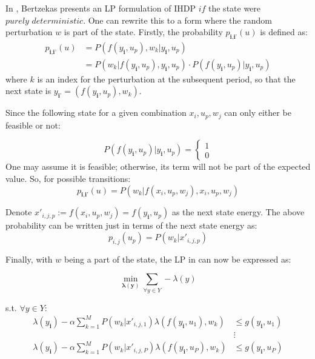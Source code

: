 \documentclass[conference]{IEEEtran}
\begin{document}
In \cite{bertsekas1995dynamic}, Bertzekas presents an LP formulation of IHDP $\textit{if}$ the state were $\textit{purely deterministic}$. One can rewrite this to a form where the random perturbation $w$ is part of the state. Firstly, the probability $p_{\textbf{i},\textbf{i'}}(u)$ is defined as: \begin{align*} 
p_{\textbf{i},\textbf{i'}}(u)&= P(f(y_{\textbf{i}},u_{p}),w_{k} | y_{\textbf{i}},u_{p}) \\ 
&= P(w_{k} | f(y_{\textbf{i}},u_{p}),y_{\textbf{i}},u_{p})\cdot P(f(y_{\textbf{i}},u_{p})| y_{\textbf{i}},u_{p})
\end{align*} where $k$ is an index for the perturbation at the subsequent period, so that the next state is $y_{\textbf{i'}}=(f(y_{\textbf{i}},u_{p}),w_{k})$.

Since the following state for a given combination $x_{i},u_{p},w_{j}$ can only either be feasible or not:

\begin{displaymath}
P(f(y_{\textbf{i}},u_{p})| y_{\textbf{i}},u_{p}) =
\left\{
\begin{array}{l}
1\\
0
\end{array}
\right.
\end{displaymath} One may assume it is feasible; otherwise, its term will not be part of the expected value. So, for possible transitions:
\begin{displaymath} 
p_{\textbf{i},\textbf{i'}}(u)=P(w_{k} | f(x_{i},u_{p},w_{j}),x_{i},u_{p},w_{j})
\end{displaymath}

Denote $x'_{i,j,p}:=f(x_{i},u_{p},w_{j})=f(y_{\textbf{i}},u_{p})$ as the next state energy. The above probability can be written just in terms of the next state energy as:
\begin{displaymath} 
p_{i,j}(u_{p})=P(w_{k} | x'_{i,j,p})
\end{displaymath}

Finally, with $w$ being a part of the state, the LP in \cite{bertsekas1995dynamic} can now be expressed as:

\begin{equation} \label{eq:prelimLP}
\min_{\boldsymbol{\lambda(y)}} \sum_{\forall y \in Y} -\lambda(y)
\end{equation}

s.t. $\forall y \in Y$: \begin{align*}
\lambda( y_{\textbf{i}})-\alpha\sum_{k=1}^{M}P(w_{k} | x'_{i,j,1})\lambda(f(y_{\textbf{i}},u_{1}),w_{k}) &\leq g(y_{\textbf{i}},u_{1}) \\
&\vdots\\
\lambda( y_{\textbf{i}})-\alpha\sum_{k=1}^{M}P(w_{k} | x'_{i,j,P})\lambda(f(y_{\textbf{i}},u_{P}),w_{k}) &\leq g(y_{\textbf{i}},u_{P})
\end{align*}
\end{document}
